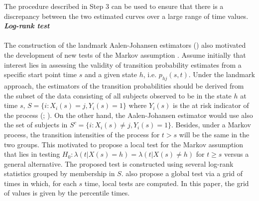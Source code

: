 The procedure described in Step 3 can be used to ensure that there is a discrepancy between the two estimated curves over a large range of time values.\\

\textit{\textbf{Log-rank test}}\\\\
The construction of the landmark Aalen-Johansen estimators () also motivated the development of new tests of the Markov assumption \citep{Titman2020}. Assume initially that interest lies in assessing the validity of transition probability estimates from a specific
start point time $s$ and a given state $h$, i.e. $p_{hj}(s,t)$. Under the landmark approach, the estimators of the transition probabilities should be derived from the subset of the data consisting of all subjects observed to be in the state $h$ at time $s$, $S=\{i:X_i(s)=j, Y_i(s)=1\}$ where $Y_i(s)$ is the at risk indicator of the process (\citealp{AlvarezMM2015}; \citealp{PutterSpitoni2018}). On the other hand, the Aalen-Johansen estimator would use also the set of subjects in $S^c=\{i:X_i(s)\neq j, Y_i(s)=1\}$. Besides, under a Markov process, the transition intensities of the process for $t>s$ will be the same in the two groups. This motivated \cite{Titman2020} to propose a local test for the Markov assumption that lies in testing $H_0: \lambda(t|X(s)=h)= \lambda(t|X(s)\neq h)$ for $t\geq s$ versus a general alternative. The proposed test is constructed using several log-rank statistics grouped by membership in $S$. \cite{Titman2020} also propose a global test via a grid of times in which, for each $s$ time, local tests are computed. In this paper, the grid of values is given by the percentile times.


